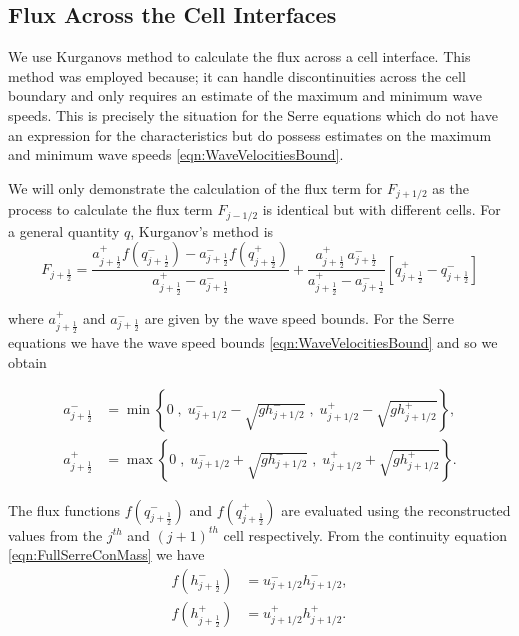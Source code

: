 \subsection{Flux Across the Cell Interfaces}

We use Kurganovs method \cite{Kurganov-etal-2001-707} to calculate the flux across a cell interface. This method was employed because; it can handle discontinuities across the cell boundary and only requires an estimate of the maximum and minimum wave speeds. This is precisely the situation for the Serre equations which do not have an expression for the characteristics but do possess estimates on the maximum and minimum wave speeds \eqref{eqn:WaveVelocitiesBound}.

We will only demonstrate the calculation of the flux term for $F_{j+1/2}$ as the process to calculate the flux term $F_{j-1/2}$ is identical but with different cells. For a general quantity $q$, Kurganov's method \cite{Kurganov-etal-2001-707} is
\begin{equation}\label{eqn:HLL_flux}
F_{j+\frac{1}{2}} = \dfrac{a^+_{j+\frac{1}{2}} f\left(q^-_{j+\frac{1}{2}}\right) - a^-_{j+\frac{1}{2}} f\left(q^+_{j+\frac{1}{2}}\right)}{a^+_{j+\frac{1}{2}} - a^-_{j+\frac{1}{2}}}  + \dfrac{a^+_{j+\frac{1}{2}} \, a^-_{j+\frac{1}{2}}}{a^+_{j+\frac{1}{2}} - a^-_{j+\frac{1}{2}}} \left [ q^+_{j+\frac{1}{2}} - q^-_{j+\frac{1}{2}} \right ]
\end{equation}

where $a^+_{j+\frac{1}{2}}$ and $a^-_{j+\frac{1}{2}}$ are given by the wave speed bounds. For the Serre equations we have the wave speed bounds \eqref{eqn:WaveVelocitiesBound} and so we obtain

\begin{align}
a^-_{j+\frac{1}{2}} &= \min\left\lbrace 0\;,\;  u^-_{j + 1/2} - \sqrt{g h^-_{j + 1/2}}  \;,\;u^+_{j + 1/2} - \sqrt{g h^+_{j + 1/2}} \right\rbrace  ,\\
a^+_{j+\frac{1}{2}} &= \max\left\lbrace 0 \;,\;  u^-_{j + 1/2} + \sqrt{g h^-_{j + 1/2}}  \;,\;u^+_{j + 1/2} + \sqrt{g h^+_{j + 1/2}} \right\rbrace .
\label{eqn:WaveSpeedBoundsFluxApprox}
\end{align}

The flux functions $f(q^-_{j+\frac{1}{2}})$ and $f(q^+_{j+\frac{1}{2}})$ are evaluated using the reconstructed values from the $j^{th}$ and $(j+1)^{th}$ cell respectively. From the continuity equation \eqref{eqn:FullSerreConMass} we have
\begin{align*}
f\left(h^-_{j+\frac{1}{2}}\right) &= u^-_{j + 1/2}  h^-_{j + 1/2}   ,\\
f\left(h^+_{j+\frac{1}{2}}\right) &= u^+_{j + 1/2}  h^+_{j + 1/2}  .
\end{align*}

